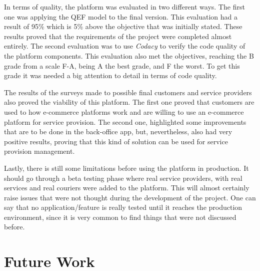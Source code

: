 \par
In terms of quality, the platform was evaluated in two different ways. The first one was applying the \gls{QEF} model to the final version. This evaluation had a result of 95\% which is 5\% above the objective that was initially stated. These results proved that the requirements of the project were completed almost entirely. The second evaluation was to use \textit{Codacy} to verify the code quality of the platform components. This evaluation also met the objectives, reaching the B grade from a scale F-A, being A the best grade, and F the worst. To get this grade it was needed a big attention to detail in terms of code quality. 
\par 
The results of the surveys made to possible final customers and service providers also proved the viability of this platform. The first one proved that customers are used to how e-commerce platforms work and are willing to use an e-commerce platform for service provision. The second one, highlighted some improvements that are to be done in the back-office app, but, nevertheless, also had very positive results, proving that this kind of solution can be used for service provision management.
\par
Lastly, there is still some limitations before using the platform in production. It should go through a beta testing phase where real service providers, with real services and real couriers were added to the platform. This will almost certainly raise issues that were not thought during the development of the project. One can say that no application/feature is really tested until it reaches the production environment, since it is very common to find things that were not discussed before.

\section{Future Work}

